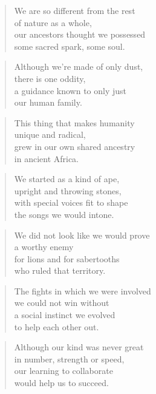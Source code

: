 \documentclass[10pt,a4paper]{article}
\begin{document}
\begin{multicols}{2}
\begin{verse}
We are so different from the rest\\
of nature as a whole,\\
our ancestors thought we possessed\\
some sacred spark, some soul.
\end{verse}

\begin{verse}
Although we’re made of only dust,\\
there is one oddity,\\
a guidance known to only just\\
our human family.
\end{verse}

\begin{verse}
This thing that makes humanity\\
unique and radical,\\
grew in our own shared ancestry\\
in ancient Africa.
\end{verse}

\begin{verse}
We started as a kind of ape,\\
upright and throwing stones,\\
with special voices fit to shape\\
the songs we would intone.
\end{verse}

\begin{verse}
We did not look like we would prove\\
a worthy enemy\\
for lions and for sabertooths\\
who ruled that territory.
\end{verse}

\begin{verse}
The fights in which we were involved\\
we could not win without\\
a social instinct we evolved\\
to help each other out.
\end{verse}

\begin{verse}
Although our kind was never great\\
in number, strength or speed,\\
our learning to collaborate\\
would help us to succeed.
\end{verse}


\end{multicols}
\end{document}
